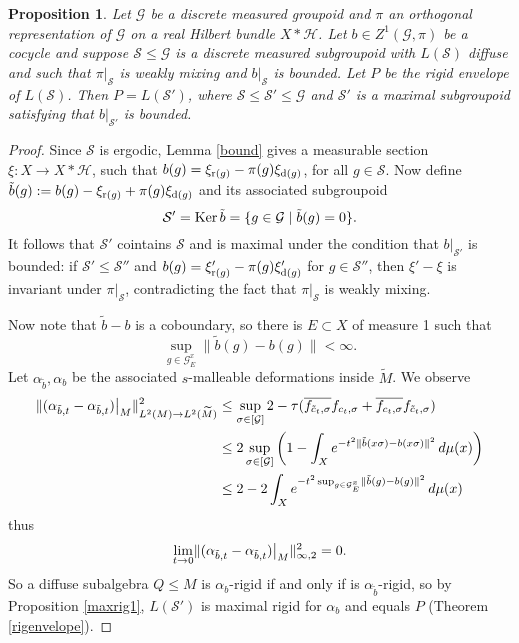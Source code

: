 \documentclass[a4paper,11pt]{article}
\numberwithin{equation}{section}
\newtheorem{prop}[thm]{Proposition}
\theoremstyle{definition}
\theoremstyle{remark}
\numberwithin{equation}{section}
\newcommand{\rG}{\mathcal{G}}
\def\H{\mathcal H}
\def\r{{\rm r}}
\def\d{{\rm d}}
\providecommand{\norm}[1]{\lVert#1\rVert}
\newcommand{\lr}[1]{\left(#1\right)}
\numberwithin{equation}{section}
\begin{document}
\begin{prop} \label{maxrig2}
  Let $ \rG $ be a discrete measured groupoid and $ \pi $ an orthogonal representation of $ \rG $ on a real Hilbert bundle $ X\ast \H $. Let $ b\in Z^{1}(\rG,\pi) $ be a cocycle and suppose $\mathcal{S}\leq \rG$ is a discrete measured subgroupoid with $L(\mathcal{S})$ diffuse and such that $\pi|_\mathcal{S}$ is weakly mixing and $b|_\mathcal{S}$ is bounded. Let $P$ be the rigid envelope of $L(\mathcal{S})$. Then $P=L(\mathcal{S}')$, where $\mathcal{S}\leq \mathcal{S}'\leq \rG$ and $\mathcal{S}'$ is a maximal subgroupoid satisfying that $b|_{\mathcal{S}'}$ is bounded.
\end{prop}

\begin{proof}
    Since $\mathcal S$ is ergodic, Lemma \ref{bound} gives a measurable section $\xi:X\to X\ast \H$, such that $b(g)=\xi_{\r(g)}-\pi(g)\xi_{\d(g)}$, for all $g\in \mathcal S$. Now define $\tilde b(g):=b(g)-\xi_{\r(g)}+\pi(g)\xi_{\d(g)}$ and its associated subgroupoid
    $$
    \mathcal S'={\rm Ker}\,\tilde b=\{g\in\rG\mid \tilde b(g)=0\}.
    $$
    It follows that $\mathcal S'$ cointains $\mathcal S$ and is maximal under the condition that $b|_{\mathcal{S}'}$ is bounded: if $\mathcal S'\leq \mathcal S''$ and $b(g)=\xi_{\r(g)}'-\pi(g)\xi_{\d(g)}'$ for $g\in \mathcal S''$, then $\xi'-\xi$ is invariant under $\pi|_\mathcal{S}$, contradicting the fact that $\pi|_\mathcal{S}$ is weakly mixing.
    
    Now note that $\tilde b-b$ is a coboundary, so there is $E\subset X$ of measure 1 such that
    $$
    \sup_{g\in \rG_E^x} \norm{\tilde b(g)-b(g)}<\infty.
    $$ Let $\alpha_{\tilde b},\alpha_{b}$ be the associated $s$-malleable deformations inside $\widetilde M$. We observe \begin{align*}
        \norm{(\alpha_{\tilde b,t}-\alpha_{\tilde b,t})\big{|}_M}_{L^2(M)\to L^2(\widetilde M)}^2&\leq \sup_{\sigma\in [\rG]} 2-\tau(\overline{f_{\tilde{c}_t,\sigma}}f_{{c}_t,\sigma}+\overline{f_{{c}_t,\sigma}}f_{\tilde{c}_t,\sigma}) \\ 
        &\leq 2\sup_{\sigma\in [\rG]} \lr{1-\int_{X} e^{-t^2\norm{\tilde b(x\sigma)-b(x\sigma)}^2}\dd{\mu(x)}} \\ 
        &\leq 2-2\int_{X} e^{-t^2\sup_{g\in \rG_E^x} \norm{\tilde b(g)-b(g)}^2}\dd{\mu(x)}
    \end{align*} thus $$
    \lim_{t\to 0} \norm{(\alpha_{\tilde b,t}-\alpha_{\tilde b,t})\big{|}_M}_{\infty,2}^2=0.
    $$ So a diffuse subalgebra $Q\leq M$ is $\alpha_{b}$-rigid if and only if is $\alpha_{\tilde b}$-rigid, so by Proposition \ref{maxrig1}, $L(\mathcal S')$ is maximal rigid for $\alpha_b$ and equals $P$ (Theorem \ref{rigenvelope}).
\end{proof}
\end{document}
